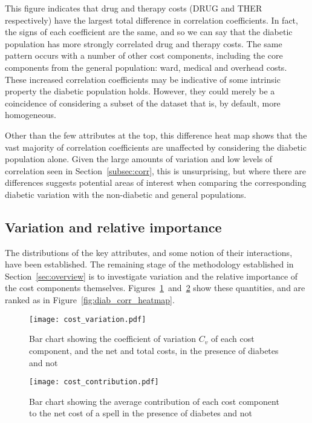 This figure indicates that drug and therapy costs (DRUG and THER respectively)
have the largest total difference in correlation coefficients. In fact, the
signs of each coefficient are the same, and so we can say that the diabetic
population has more strongly correlated drug and therapy costs. The same pattern
occurs with a number of other cost components, including the core components
from the general population: ward, medical and overhead costs. These increased
correlation coefficients may be indicative of some intrinsic property the
diabetic population holds. However, they could merely be a coincidence of
considering a subset of the dataset that is, by default, more homogeneous.

Other than the few attributes at the top, this difference heat map shows that
the vast majority of correlation coefficients are unaffected by considering the
diabetic population alone. Given the large amounts of variation and low levels
of correlation seen in Section~\ref{subsec:corr}, this is unsurprising, but
where there are differences suggests potential areas of interest when comparing
the corresponding diabetic variation with the non-diabetic and general
populations.


\subsection{Variation and relative importance}\label{subsec:diab_variation}

The distributions of the key attributes, and some notion of their interactions,
have been established. The remaining stage of the methodology established in
Section~\ref{sec:overview} is to investigate variation and the relative
importance of the cost components themselves.
Figures~\ref{fig:diab_variation}~and~\ref{fig:diab_contribution} show these
quantities, and are ranked as in Figure~\ref{fig:diab_corr_heatmap}.

\begin{figure}
    \centering
    \texttt{[image: cost\_variation.pdf]}
    \caption{%
        Bar chart showing the coefficient of variation \(C_{v}\) of each cost
        component, and the net and total costs, in the presence of diabetes and
        not
    }\label{fig:diab_variation}
\end{figure}

\begin{figure}
    \centering
    \texttt{[image: cost\_contribution.pdf]}
    \caption{%
        Bar chart showing the average contribution of each cost component
        to the net cost of a spell in the presence of diabetes and not
    }\label{fig:diab_contribution}
\end{figure}

